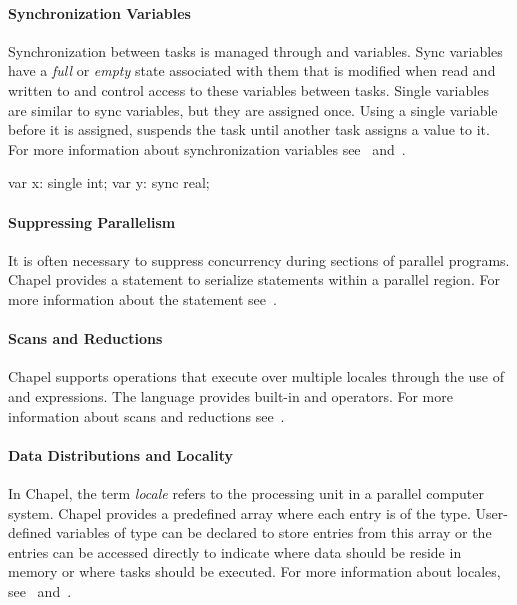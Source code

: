 \paragraph{Synchronization Variables}
Synchronization between tasks is managed through 
and  variables.  Sync variables have a {\em full} or {\em
empty} state associated with them that is modified when read and
written to and control access to these variables between tasks.
Single variables are similar to sync variables, but they are assigned
once.  Using a single variable before it is assigned, suspends the
task until another task assigns a value to it.  For more information
about synchronization variables see~
and~.
\begin{chapel}
var x: single int;
var y: sync real;
\end{chapel}

\paragraph{Suppressing Parallelism}
It is often necessary to suppress concurrency during sections of
parallel programs.  Chapel provides a  statement to
serialize statements within a parallel region.  For more information
about the  statement see~.


\paragraph{Scans and Reductions}
Chapel supports operations that execute over multiple locales through
the use of  and  expressions.  The language
provides built-in  and  operators.  For more
information about scans and reductions see~.

\paragraph{Data Distributions and Locality}

In Chapel, the term {\em locale} refers to the processing unit in a
parallel computer system.  Chapel provides a predefined
array  where each entry is of the  type.
User-defined variables of  type can be declared to store
entries from this  array or the entries can be accessed
directly to indicate where data should be reside in memory or where
tasks should be executed.  For more information about locales,
see~ and~.

